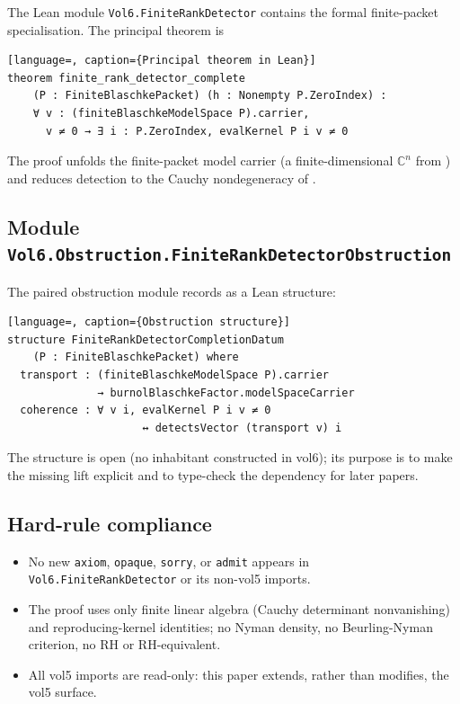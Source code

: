 \documentclass[12pt]{article}
\theoremstyle{definition}
\theoremstyle{remark}
\newcommand{\C}{\mathbb{C}}
\begin{document}
The Lean module \texttt{Vol6.FiniteRankDetector} contains the formal
finite-packet specialisation. The principal theorem is

\begin{lstlisting}[language=, caption={Principal theorem in Lean}]
theorem finite_rank_detector_complete
    (P : FiniteBlaschkePacket) (h : Nonempty P.ZeroIndex) :
    ∀ v : (finiteBlaschkeModelSpace P).carrier,
      v ≠ 0 → ∃ i : P.ZeroIndex, evalKernel P i v ≠ 0
\end{lstlisting}

The proof unfolds the finite-packet model carrier (a finite-dimensional
$\C^{n}$ from \cite[Paper~01]{Vol6KB}) and reduces detection to the Cauchy
nondegeneracy of .

\subsection{Module \texttt{Vol6.Obstruction.FiniteRankDetectorObstruction}}

The paired obstruction module records  as a Lean
structure:

\begin{lstlisting}[language=, caption={Obstruction structure}]
structure FiniteRankDetectorCompletionDatum
    (P : FiniteBlaschkePacket) where
  transport : (finiteBlaschkeModelSpace P).carrier
              → burnolBlaschkeFactor.modelSpaceCarrier
  coherence : ∀ v i, evalKernel P i v ≠ 0
                     ↔ detectsVector (transport v) i
\end{lstlisting}

The structure is open (no inhabitant constructed in vol6); its purpose is
to make the missing lift explicit and to type-check the dependency for
later papers.

\subsection{Hard-rule compliance}

\begin{itemize}\itemsep0pt
  \item No new \texttt{axiom}, \texttt{opaque}, \texttt{sorry}, or
        \texttt{admit} appears in \texttt{Vol6.FiniteRankDetector} or its
        non-vol5 imports.
  \item The proof uses only finite linear algebra (Cauchy determinant
        nonvanishing) and reproducing-kernel identities; no Nyman density,
        no Beurling-Nyman criterion, no RH or RH-equivalent.
  \item All vol5 imports are read-only: this paper extends, rather than
        modifies, the vol5 surface.
\end{itemize}
\end{document}
